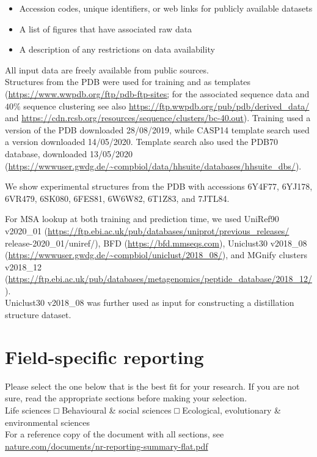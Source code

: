 \documentclass[10pt]{article}
\begin{document}
\begin{itemize}
  \item Accession codes, unique identifiers, or web links for publicly available datasets
  \item A list of figures that have associated raw data
  \item A description of any restrictions on data availability
\end{itemize}

All input data are freely available from public sources.\\
Structures from the PDB were used for training and as templates (\href{https://www.wwpdb.org/ftp/pdb-ftp-sites;}{https://www.wwpdb.org/ftp/pdb-ftp-sites;} for the associated sequence data and $40 \%$ sequence clustering see also \href{https://ftp.wwpdb.org/pub/pdb/derived_data/}{https://ftp.wwpdb.org/pub/pdb/derived\_data/} and \href{https://cdn.rcsb.org/resources/sequence/clusters/bc-40.out}{https://cdn.rcsb.org/resources/sequence/clusters/bc-40.out}). Training used a version of the PDB downloaded 28/08/2019, while CASP14 template search used a version downloaded 14/05/2020. Template search also used the PDB70 database, downloaded 13/05/2020 (\href{https://wwwuser.gwdg.de/~compbiol/data/hhsuite/databases/hhsuite_dbs/}{https://wwwuser.gwdg.de/\~{}compbiol/data/hhsuite/databases/hhsuite\_dbs/}).

We show experimental structures from the PDB with accessions 6Y4F77, 6YJ178, 6VR479, 6SK080, 6FES81, 6W6W82, 6T1Z83, and 7JTL84.

For MSA lookup at both training and prediction time, we used UniRef90 v2020\_01 (\href{https://ftp.ebi.ac.uk/pub/databases/uniprot/previous_releases/}{https://ftp.ebi.ac.uk/pub/databases/uniprot/previous\_releases/} release-2020\_01/uniref/), BFD (\href{https://bfd.mmseqs.com}{https://bfd.mmseqs.com}), Uniclust30 v2018\_08 (\href{https://wwwuser.gwdg.de/~compbiol/uniclust/2018_08/}{https://wwwuser.gwdg.de/\~{}compbiol/uniclust/2018\_08/}), and MGnify clusters v2018\_12 (\href{https://ftp.ebi.ac.uk/pub/databases/metagenomics/peptide_database/2018_12/}{https://ftp.ebi.ac.uk/pub/databases/metagenomics/peptide\_database/2018\_12/}).\\
Uniclust30 v2018\_08 was further used as input for constructing a distillation structure dataset.

\section*{Field-specific reporting}
Please select the one below that is the best fit for your research. If you are not sure, read the appropriate sections before making your selection.\\
Life sciences □ Behavioural \& social sciences □ Ecological, evolutionary \& environmental sciences\\
For a reference copy of the document with all sections, see \href{http://nature.com/documents/nr-reporting-summary-flat.pdf}{nature.com/documents/nr-reporting-summary-flat.pdf}
\end{document}
